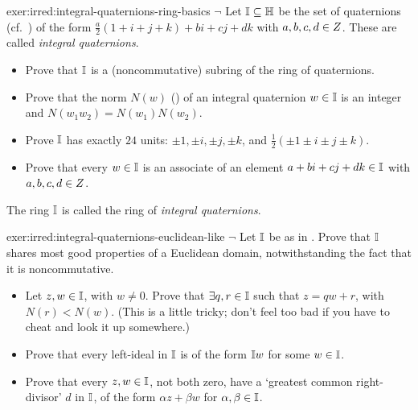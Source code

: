 \begin{exer}{}{exer:irred:integral-quaternions-ring-basics}
  $\lnot$ Let $\mathbb{I} \subseteq \mathbb{H}$ be the set of
  quaternions (cf.\ ) of the form
  $\frac{a}{2}(1 + i + j + k) + bi + cj + dk$ with
  $a, b, c, d \in Z$. These are called \emph{integral quaternions}.
  \begin{itemize}
  \item Prove that $\mathbb{I}$ is a (noncommutative) subring of the
    ring of quaternions.
  \item Prove that the norm $N(w)$ ()
    of an integral quaternion $w \in \mathbb{I}$ is an integer and
    $N(w_1 w_2) = N(w_1)N(w_2)$.
  \item Prove $\mathbb{I}$ has exactly $24$ units:
    $\pm 1, \pm i, \pm j, \pm k$, and
    $\frac{1}{2}(\pm 1 \pm i \pm j \pm k)$.
  \item Prove that every $w \in \mathbb{I}$ is an associate of an
    element $a + bi + cj + dk \in \mathbb{I}$ with $a, b, c, d \in Z$.
  \end{itemize}
  The ring $\mathbb{I}$ is called the ring of \emph{integral
    quaternions}.
\end{exer}
\begin{exer}{}{exer:irred:integral-quaternions-euclidean-like}
  $\lnot$ Let $\mathbb{I}$ be as in
  . Prove that
  $\mathbb{I}$ shares most good properties of a Euclidean domain,
  notwithstanding the fact that it is noncommutative.
  \begin{itemize}
  \item Let $z, w \in \mathbb{I}$, with $w \neq 0$. Prove that
    $\exists q, r \in \mathbb{I}$ such that $z = qw + r$, with
    $N(r) < N(w)$. (This is a little tricky; don't feel too bad if you
    have to cheat and look it up somewhere.)
  \item Prove that every left-ideal in $\mathbb{I}$ is of the form
    $\mathbb{I}w$ for some $w \in \mathbb{I}$.
  \item Prove that every $z, w \in \mathbb{I}$, not both zero, have a
    `greatest common right-divisor' $d$ in $\mathbb{I}$, of the form
    $\alpha z + \beta w$ for $\alpha, \beta \in \mathbb{I}$.
  \end{itemize}
\end{exer}
